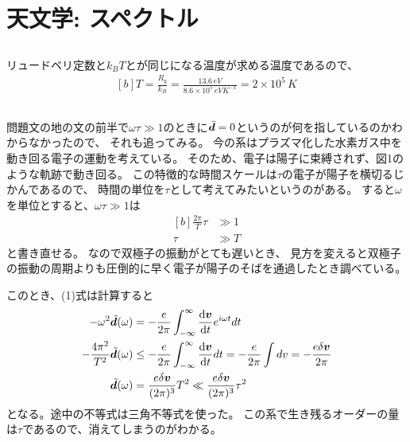 \documentclass[../../sp_2017.tex]{subfiles}
\begin{document}
\setcounter{section}{5}
\section{天文学: スペクトル}
\subsection{}
リュードベリ定数と\(k_BT\)とが同じになる温度が求める温度であるので、
\begin{equation}\begin{aligned}[b]
    T = \frac{R_y}{k_B}=\frac{13.6 \,\si{eV}}{8.6\times 10^5 \,\si{eV K^{-1}}}= 2\times10^5 \,\si{K}
\end{aligned}\end{equation}
\subsection{}
問題文の地の文の前半で\(\omega \tau\gg 1\)のときに\(\tilde{\vb*{d}}=0\)というのが何を指しているのかわからなかったので、
それも追ってみる。
今の系はプラズマ化した水素ガス中を動き回る電子の運動を考えている。
そのため、電子は陽子に束縛されず、図1のような軌跡で動き回る。
この特徴的な時間スケールは\(\tau\)の電子が陽子を横切るじかんであるので、
時間の単位を\(\tau\)として考えてみたいというのがある。
すると\(\omega\)を単位とすると、\(\omega \tau\gg 1\)は
\begin{equation}\begin{aligned}[b]
    \frac{2\pi}{T}\tau &\gg 1\\
    \tau &\gg T
\end{aligned}\end{equation}
と書き直せる。
なので双極子の振動がとても遅いとき、
見方を変えると双極子の振動の周期よりも圧倒的に早く電子が陽子のそばを通過したとき調べている。

このとき、(1)式は計算すると
\begin{equation}\begin{aligned}[b]
    -\omega^2\tilde{\vb*{d}}(\omega)
        &= -\frac{e}{2\pi}\int_{-\infty}^\infty\dv{\vb*{v}}{t}e^{i\omega t}dt\\
    -\frac{4\pi^2}{T^2}\tilde{\vb*{d}}(\omega)
        &\leq-\frac{e}{2\pi}\int_{-\infty}^\infty\dv{\vb*{v}}{t}dt
        = -\frac{e}{2\pi}\int dv
        = -\frac{e\delta \vb*{v}}{2\pi}\\
    \tilde{\vb*{d}}(\omega)
        &= \frac{e\delta \vb*{v}}{(2\pi)^3}T^2
        \ll \frac{e\delta \vb*{v}}{(2\pi)^3}\tau^2
\end{aligned}\end{equation}
となる。途中の不等式は三角不等式を使った。
この系で生き残るオーダーの量は\(\tau\)であるので、消えてしまうのがわかる。
\end{document}
